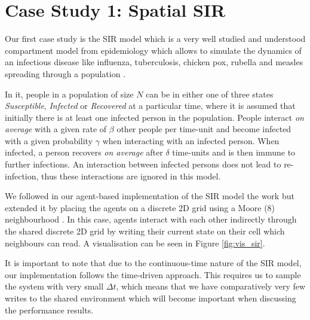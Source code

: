 \section{Case Study 1: Spatial SIR} %
\label{sec:cs_sir}

Our first case study is the SIR model which is a very well studied and understood compartment model from epidemiology \cite{kermack_contribution_1927} which allows to simulate the dynamics of an infectious disease like influenza, tuberculosis, chicken pox, rubella and measles spreading through a population \cite{enns_its_2010}.

In it, people in a population of size $N$ can be in either one of three states \textit{Susceptible}, \textit{Infected} or \textit{Recovered} at a particular time, where it is assumed that initially there is at least one infected person in the population. People interact \textit{on average} with a given rate of $\beta$ other people per time-unit and become infected with a given probability $\gamma$ when interacting with an infected person. When infected, a person recovers \textit{on average} after $\delta$ time-units and is then immune to further infections. An interaction between infected persons does not lead to re-infection, thus these interactions are ignored in this model. 

We followed in our agent-based implementation of the SIR model the work \cite{macal_agent-based_2010} but extended it by placing the agents on a discrete 2D grid using a Moore (8) neighbourhood \cite{thaler_pure_2019}. In this case, agents interact with each other indirectly through the shared discrete 2D grid by writing their current state on their cell which neighbours can read. A visualisation can be seen in Figure \ref{fig:vis_sir}.

It is important to note that due to the continuous-time nature of the SIR model, our implementation follows the time-driven \cite{meyer_event-driven_2014} approach. This requires us to sample the system with very small $\Delta t$, which means that we have comparatively very few writes to the shared environment which will become important when discussing the performance results.

